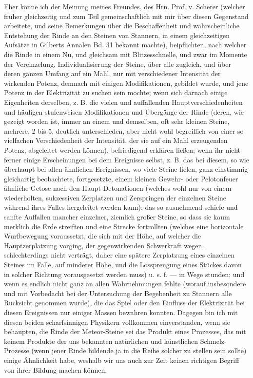 \documentclass[a4paper, 11pt, oneside, german]{article}
\begin{document}
Eher könne ich der Meinung meines Freundes, des Hrn. Prof. v. Scherer (welcher früher gleichzeitig und zum Teil gemeinschaftlich mit mir über diesen Gegenstand arbeitete, und seine Bemerkungen über die Beschaffenheit und wahrscheinliche Entstehung der Rinde an den Steinen von Stannern, in einem gleichzeitigen Aufsätze in Gilberts Annalen Bd. 31 bekannt machte), beipflichten, nach welcher die Rinde in einem Nu, und gleichsam mit Blitzesschnelle, und zwar im Momente der Vereinzelung, Individualisierung der Steine, über alle zugleich, und über deren ganzen Umfang auf ein Mahl, nur mit verschiedener Intensität der wirkenden Potenz, demnach mit einigen Modifikationen, gebildet wurde, und jene Potenz in der Elektrizität zu suchen sein mochte; wenn sich darnach einige Eigenheiten derselben, z. B. die vielen und auffallenden Hauptverschiedenheiten und häufigen stufenweisen Modifikationen und Übergänge der Rinde (deren, wie gezeigt worden ist, immer an einem und demselben, oft sehr kleinen Steine, mehrere, 2 bis 5, deutlich unterschieden, aber nicht wohl begreiflich von einer so vielfachen Verschiedenheit der Intensität, der sie auf ein Mahl erzeugenden Potenz, abgeleitet werden können), befriedigend erklären ließen; wenn ihr nicht ferner einige Erscheinungen bei dem Ereignisse selbst, z. B. das bei diesem, so wie überhaupt bei allen ähnlichen Ereignissen, wo viele Steine fielen, ganz einstimmig gleichartig beobachtete, fortgesetzte, einem kleinen Gewehr- oder Pelotonfeuer ähnliche Getose nach den Haupt-Detonationen (welches wohl nur von einem wiederholten, sukzessiven Zerplatzen und Zerspringen der einzelnen Steine während ihres Falles hergeleitet werden kann); das so ausnehmend schiefe und sanfte Auffallen mancher einzelner, ziemlich großer Steine, so dass sie kaum merklich die Erde streiften und eine Strecke fortrollten (welches eine horizontale Wurfbewegung voraussetzt, die sich mit der Höhe, auf welcher die Hauptzerplatzung vorging, der gegenwirkenden Schwerkraft wegen, schlechterdings nicht verträgt, daher eine spätere Zerplatzung eines einzelnen Steines im Falle, auf minderer Höhe, und die Lossprengung eines Stückes davon in solcher Richtung vorausgesetzt werden muss) u. s. f. --- in Wege stunden; und wenn es endlich nicht ganz an allen Wahrnehmungen fehlte (worauf insbesondere und mit Vorbedacht bei der Untersuchung der Begebenheit zu Stannern alle Rucksicht genommen wurde), die das Spiel oder den Einfluss der Elektrizität bei diesen Ereignissen nur einiger Massen bewahren konnten. Dagegen bin ich mit diesen beiden scharfsinnigen Physikern vollkommen einverstanden, wenn sie behaupten, die Rinde der Meteor-Steine sei das Produkt eines Prozesses, das mit keinem Produkte der uns bekannten natürlichen und künstlichen Schmelz-Prozesse (wenn jener Rinde bildende ja in die Reihe solcher zu stellen sein sollte) einige Ähnlichkeit habe, weshalb wir uns auch zur Zeit keinen richtigen Begriff von ihrer Bildung machen können.
\clearpage
\end{document}
